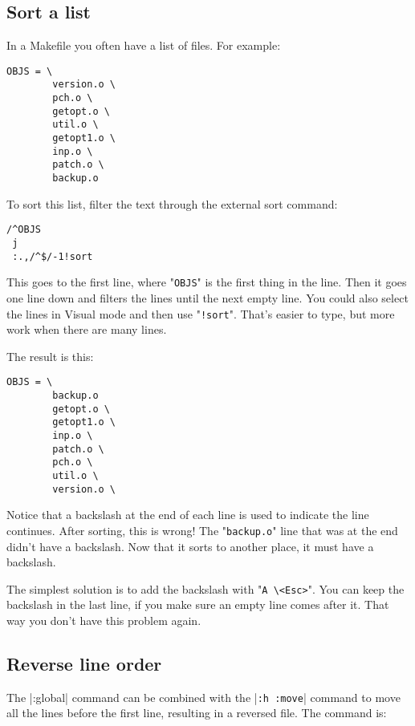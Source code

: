 \subsection{Sort a list}

In a Makefile you often have a list of files.
For example:

\begin{Verbatim}[samepage=true]
    OBJS = \ 
        version.o \ 
        pch.o \ 
        getopt.o \ 
        util.o \ 
        getopt1.o \ 
        inp.o \ 
        patch.o \ 
        backup.o 
\end{Verbatim}

To sort this list, filter the text through the external sort command:

\begin{Verbatim}[samepage=true]
 /^OBJS
 j
 :.,/^$/-1!sort
\end{Verbatim}

This goes to the first line, where "\verb!OBJS!" is the first thing in the line.
Then it goes one line down and filters the lines until the next empty line.
You could also select the lines in Visual mode and then use "\verb:!sort:".
That's easier to type, but more work when there are many lines.

The result is this:

\begin{Verbatim}[samepage=true]
    OBJS = \ 
        backup.o 
        getopt.o \ 
        getopt1.o \ 
        inp.o \ 
        patch.o \ 
        pch.o \ 
        util.o \ 
        version.o \ 
\end{Verbatim}

Notice that a backslash at the end of each line is used to indicate the line continues.
After sorting, this is wrong!
The "\verb!backup.o!" line that was at the end didn't have a backslash.
Now that it sorts to another place, it must have a backslash.

The simplest solution is to add the backslash with "\verb!A \<Esc>!".
You can keep the backslash in the last line, if you make sure an empty line comes after it.
That way you don't have this problem again.
\subsection{Reverse line order}

The |:global| command can be combined with the |\verb!:h :move!| command to move all the lines before the first line, resulting in a reversed file.
The command is:

